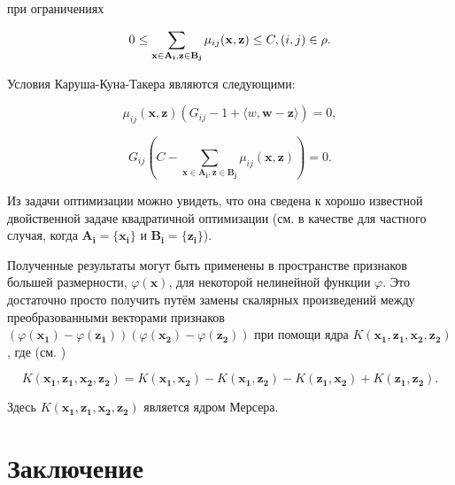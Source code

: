 \documentclass[12pt,a4paper,oneside]{article}
\begin{document}
\par
при ограничениях

\[
0 \leq \sum \limits_{\mathbf{x} \in \mathbf{A_i}, \mathbf{z} \in \mathbf{B_j}} \mu_{ij} (\mathbf{x}, \mathbf{z}) \leq C, (i, j) \in \mathrm{\rho}.
\]

\par
Условия Каруша-Куна-Такера являются следующими:

\[
\mu_{ij} (\mathbf{x}, \mathbf{z}) (G_{ij} - 1 + \langle w, \mathbf{w} - \mathbf{z} \rangle) = 0,
\]

\[
G_{ij} (C - \sum \limits_{\mathbf{x} \in \mathbf{A_i}, \mathbf{z} \in \mathbf{B_j}} \mu_{ij} (\mathbf{x}, \mathbf{z})) = 0.
\]

\par
Из задачи оптимизации можно увидеть, что она сведена к хорошо известной двойственной задаче квадратичной оптимизации (см. в качестве  для частного случая, когда \(\mathbf{A_i} = \{\mathbf{x_i}\}\) и \(\mathbf{B_i} = \{\mathbf{z_i}\}\)). 

\par
Полученные результаты могут быть применены в пространстве признаков большей размерности, \(\varphi(\mathbf{x})\), для некоторой нелинейной функции \(\varphi\). 
Это достаточно просто получить путём замены скалярных произведений между преобразованными векторами признаков \((\varphi(\mathbf{x_1}) - \varphi(\mathbf{z_1})) (\varphi(\mathbf{x_2}) - \varphi(\mathbf{z_2}))\) при помощи ядра \(K(\mathbf{x_1}, \mathbf{z_1}, \mathbf{x_2}, \mathbf{z_2})\), где (см. )

\[
K(\mathbf{x_1}, \mathbf{z_1}, \mathbf{x_2}, \mathbf{z_2}) = K(\mathbf{x_1}, \mathbf{x_2}) - K(\mathbf{x_1}, \mathbf{z_2}) - K(\mathbf{z_1}, \mathbf{x_2}) + K(\mathbf{z_1}, \mathbf{z_2}).
\]

\par
Здесь \(K(\mathbf{x_1}, \mathbf{z_1}, \mathbf{x_2}, \mathbf{z_2})\) является ядром Мерсера. 

\section{Заключение}
\label{sec:conclusions}
\end{document}
